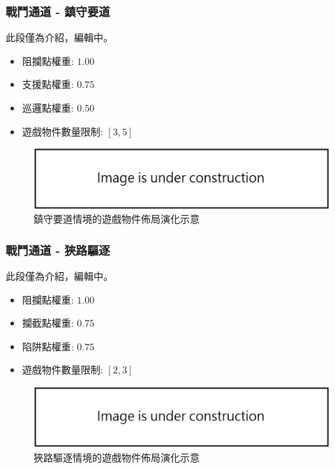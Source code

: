 \subsubsection{戰鬥通道 - 鎮守要道}
\label{sssec:method-segments-appliedonvolumes-battlepath-i}

此段僅為介紹，編輯中。

\begin{itemize}
  \setlength\itemsep{-0.5em}
  \item 阻攔點權重: $1.00$
  \item 支援點權重: $0.75$
  \item 巡邏點權重: $0.50$
  \item 遊戲物件數量限制: $[3, 5]$
\end{itemize}

\begin{figure}[ht]
  \begin{center}
    \includegraphics[width=1.0\textwidth]{figures/under_construction.png}
    \caption{鎮守要道情境的遊戲物件佈局演化示意} 
    \label{fig:applied-ga-on-volume-battlepath-ii}
  \end{center}
\end{figure}

\subsubsection{戰鬥通道 - 狹路驅逐}
\label{sssec:method-segments-appliedonvolumes-battlepath-ii}

此段僅為介紹，編輯中。

\begin{itemize}
  \setlength\itemsep{-0.5em}
  \item 阻攔點權重: $1.00$
  \item 攔截點權重: $0.75$
  \item 陷阱點權重: $0.75$
  \item 遊戲物件數量限制: $[2, 3]$
\end{itemize}

\begin{figure}[ht]
  \begin{center}
    \includegraphics[width=1.0\textwidth]{figures/under_construction.png}
    \caption{狹路驅逐情境的遊戲物件佈局演化示意} 
    \label{fig:applied-ga-on-volume-battlepath-ii}
  \end{center}
\end{figure}

